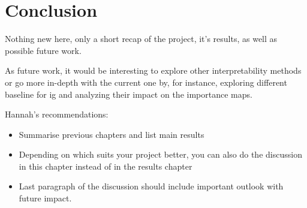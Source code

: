
\chapter{Conclusion}
\label{ch:Conclusion}

Nothing new here, only a short recap of the project, it's results, as well as possible future work.

As future work, it would be interesting to explore other interpretability  methods or go more in-depth with the current one by, for instance, exploring different baseline for \acrlong{ig} and analyzing their impact on the importance maps.


Hannah's recommendations:
\begin{itemize}
  \item Summarise previous chapters and list main results
  \item Depending on which suits your project better, you can also do the discussion in this chapter instead of in the results chapter
  \item Last paragraph of the discussion should include important outlook with future impact.
\end{itemize}




